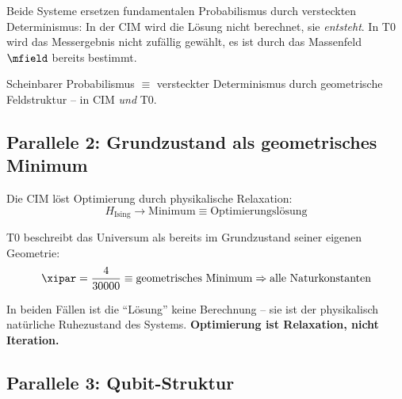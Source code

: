 Beide Systeme ersetzen fundamentalen Probabilismus durch versteckten Determinismus:
In der CIM wird die Lösung nicht berechnet, sie \emph{entsteht}.
In T0 wird das Messergebnis nicht zufällig gewählt, es ist durch das Massenfeld 
$\mfield$ bereits bestimmt.

\begin{keyresult}[Parallele 1]
    Scheinbarer Probabilismus $\equiv$ versteckter Determinismus durch geometrische 
    Feldstruktur -- in CIM \emph{und} T0.
\end{keyresult}

\subsection{Parallele 2: Grundzustand als geometrisches Minimum}

Die CIM löst Optimierung durch physikalische Relaxation:
\begin{equation}
    H_{\text{Ising}} \rightarrow \text{Minimum} \equiv \text{Optimierungslösung}
    \label{eq:cim_groundstate}
\end{equation}

T0 beschreibt das Universum als bereits im Grundzustand seiner eigenen Geometrie:
\begin{equation}
    \xipar = \frac{4}{30000} \equiv \text{geometrisches Minimum} \Rightarrow 
    \text{alle Naturkonstanten}
    \label{eq:t0_groundstate}
\end{equation}

In beiden Fällen ist die ``Lösung'' keine Berechnung -- sie ist der physikalisch 
natürliche Ruhezustand des Systems. \textbf{Optimierung ist Relaxation, nicht Iteration.}

\subsection{Parallele 3: Qubit-Struktur}

\begin{table}[h]
    \centering
    \caption{Parallele 3: Vergleich der Qubit-Strukturen}
    \label{tab:parallel3}
\end{table}

